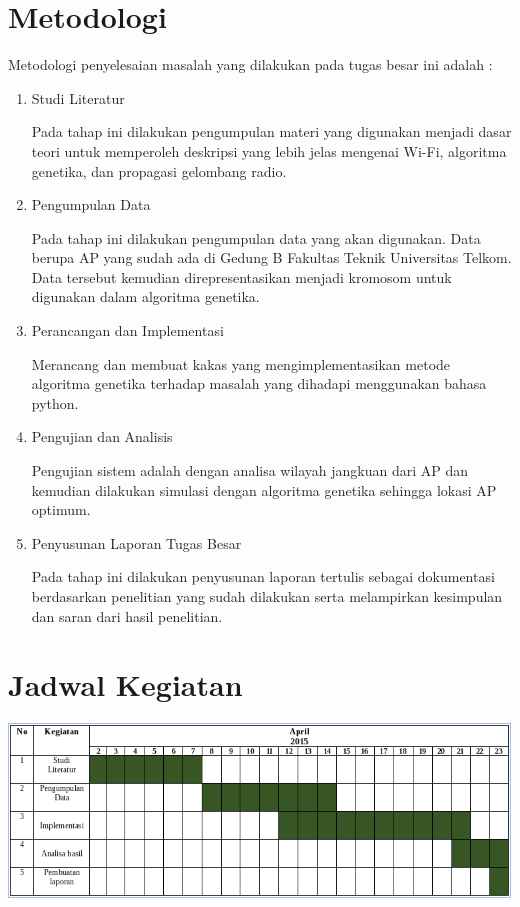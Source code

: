 \documentclass[12pt,a4paper]{report}
\begin{document}
		\section{Metodologi}
		Metodologi penyelesaian masalah yang dilakukan pada tugas besar ini adalah :
		\begin{enumerate}
			\item Studi Literatur
			
			Pada tahap ini dilakukan pengumpulan materi yang digunakan menjadi dasar teori untuk memperoleh deskripsi yang lebih jelas mengenai Wi-Fi, algoritma genetika, dan propagasi gelombang radio.
			
			\item Pengumpulan Data
			
			Pada tahap ini dilakukan pengumpulan data yang akan digunakan. Data berupa AP yang sudah ada di Gedung B Fakultas Teknik Universitas Telkom. Data tersebut kemudian direpresentasikan menjadi kromosom untuk  digunakan dalam algoritma genetika.
			
			\item Perancangan dan Implementasi
			
			Merancang dan membuat kakas yang mengimplementasikan metode algoritma genetika terhadap masalah yang dihadapi menggunakan bahasa python.
			
			\item Pengujian dan Analisis
			
			Pengujian sistem adalah dengan analisa wilayah jangkuan dari AP dan kemudian dilakukan simulasi dengan  algoritma genetika sehingga lokasi AP optimum.
			
			\item Penyusunan Laporan Tugas Besar
			
			Pada tahap ini dilakukan penyusunan laporan tertulis sebagai dokumentasi berdasarkan penelitian yang sudah dilakukan serta melampirkan kesimpulan dan saran dari hasil penelitian.
		\end{enumerate}
		
		
		\section{Jadwal Kegiatan}
		\includegraphics[width=\linewidth]{jadwal}
		\newpage
\end{document}
